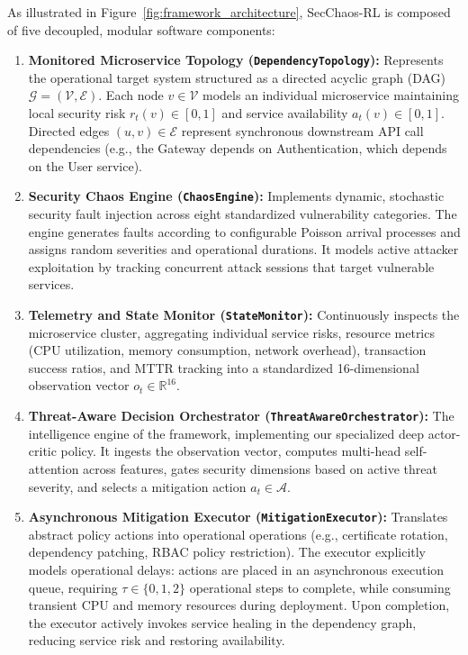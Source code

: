 \documentclass[ASNA,twocolumn]{USG}
\begin{document}
As illustrated in Figure~\ref{fig:framework_architecture}, SecChaos-RL is composed of five decoupled, modular software components:

\begin{enumerate}
    \item \textbf{Monitored Microservice Topology (\texttt{DependencyTopology}):} Represents the operational target system structured as a directed acyclic graph (DAG) $\mathcal{G} = (\mathcal{V}, \mathcal{E})$. Each node $v \in \mathcal{V}$ models an individual microservice maintaining local security risk $r_t(v) \in [0, 1]$ and service availability $a_t(v) \in [0, 1]$. Directed edges $(u, v) \in \mathcal{E}$ represent synchronous downstream API call dependencies (e.g., the Gateway depends on Authentication, which depends on the User service).
    \item \textbf{Security Chaos Engine (\texttt{ChaosEngine}):} Implements dynamic, stochastic security fault injection across eight standardized vulnerability categories. The engine generates faults according to configurable Poisson arrival processes and assigns random severities and operational durations. It models active attacker exploitation by tracking concurrent attack sessions that target vulnerable services.
    \item \textbf{Telemetry and State Monitor (\texttt{StateMonitor}):} Continuously inspects the microservice cluster, aggregating individual service risks, resource metrics (CPU utilization, memory consumption, network overhead), transaction success ratios, and MTTR tracking into a standardized 16-dimensional observation vector $o_t \in \mathbb{R}^{16}$.
    \item \textbf{Threat-Aware Decision Orchestrator (\texttt{ThreatAwareOrchestrator}):} The intelligence engine of the framework, implementing our specialized deep actor-critic policy. It ingests the observation vector, computes multi-head self-attention across features, gates security dimensions based on active threat severity, and selects a mitigation action $a_t \in \mathcal{A}$.
    \item \textbf{Asynchronous Mitigation Executor (\texttt{MitigationExecutor}):} Translates abstract policy actions into operational operations (e.g., certificate rotation, dependency patching, RBAC policy restriction). The executor explicitly models operational delays: actions are placed in an asynchronous execution queue, requiring $\tau \in \{0, 1, 2\}$ operational steps to complete, while consuming transient CPU and memory resources during deployment. Upon completion, the executor actively invokes service healing in the dependency graph, reducing service risk and restoring availability.
\end{enumerate}
\end{document}
